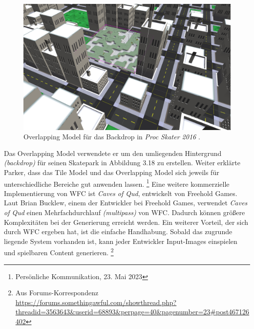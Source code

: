 \documentclass[12pt, a4paper,twoside,openany]{report} %
\begin{document}
\pagebreak

\begin{figure}
    \includegraphics[width=1\linewidth]{images/proc-skate-backdrop.png}%
    \caption{Overlapping Model für das Backdrop in \textit{Proc Skater 2016} \cite{procskater2016}.}%
\end{figure}

Das Overlapping Model verwendete er um den umliegenden Hintergrund \textit{(backdrop)} für seinen Skatepark in Abbildung 3.18 zu erstellen.
Weiter erklärte Parker, dass das Tile Model und das Overlapping Model sich jeweils für unterschiedliche Bereiche gut anwenden lassen.
\footnote[5]{Persönliche Kommunikation, 23. Mai 2023}
\newline
Eine weitere kommerzielle Implementierung von WFC ist \textit{Caves of Qud}, entwickelt von Freehold Games.
Laut Brian Bucklew, einem der Entwickler bei Freehold Games, verwendet \textit{Caves of Qud} einen Mehrfachdurchlauf \textit{(multipass)} von WFC.
Dadurch können größere Komplexitäten bei der Generierung erreicht werden.
Ein weiterer Vorteil, der sich durch WFC ergeben hat, ist die einfache Handhabung.
Sobald das zugrunde liegende System vorhanden ist, kann jeder Entwickler Input-Images einspielen und spielbaren Content generieren.
\footnote[6]{Aus Forums-Korrespondenz \url{https://forums.somethingawful.com/showthread.php?threadid=3563643&userid=68893&perpage=40&pagenumber=23\#post467126402}} \cite{Karth2017WaveFunctionCollapseIC}
\end{document}
